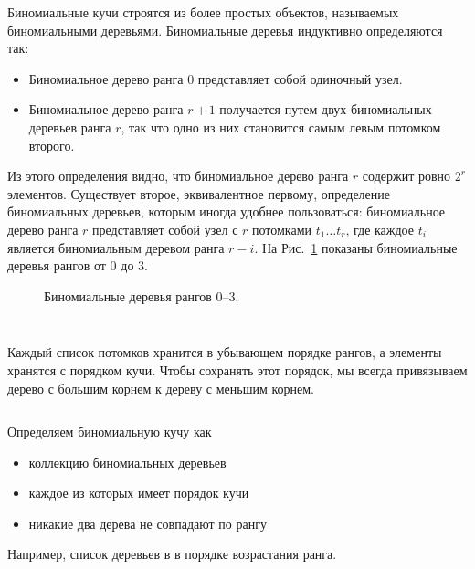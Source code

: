 \begin{frame}[fragile]{}
Биномиальные кучи строятся из более простых объектов, называемых
биномиальными деревьями. Биномиальные деревья индуктивно определяются
так:
\begin{itemize}
  \item Биномиальное дерево ранга 0 представляет собой одиночный узел.
  \item Биномиальное дерево ранга $r+1$ получается путем
   двух биномиальных деревьев ранга $r$, так
  что одно из них становится самым левым потомком второго.
\end{itemize}
Из этого определения видно, что биномиальное дерево ранга $r$ содержит
ровно $2^r$ элементов.  Существует второе, эквивалентное первому,
определение биномиальных деревьев, которым иногда удобнее
пользоваться: биномиальное дерево ранга $r$ представляет собой узел
с $r$ потомками $t_1\ldots t_r$, где каждое $t_i$ является
биномиальным деревом ранга $r-i$.  На Рис.~\ref{fig:3.3} показаны
биномиальные деревья рангов от 0 до 3.
\end{frame}


\begin{frame}[fragile]{}
\begin{figure}[h]
  \centering
  
  \caption{Биномиальные деревья рангов 0--3.}
  \label{fig:3.3}
\end{figure}

\inputminted[firstline=5, lastline=6] {haskell}{code/BinomialHeap.lhs}

\end{frame}


\begin{frame}[fragile]{}
\inputminted[firstline=5, lastline=6] {haskell}{code/BinomialHeap.lhs}
Каждый список потомков хранится в убывающем порядке рангов, а элементы
хранятся с порядком кучи.  Чтобы сохранять этот порядок, мы всегда
привязываем дерево с большим корнем к дереву с меньшим корнем.
\inputminted[firstline=11, lastline=14] {haskell}{code/BinomialHeap.lhs}
\end{frame}


\begin{frame}[fragile]{}
Определяем биномиальную кучу как 
\begin{itemize}
  \item коллекцию биномиальных деревьев
  \item каждое из которых имеет порядок кучи
  \item никакие два дерева не совпадают по рангу
\end{itemize} 
Например, список деревьев в в порядке возрастания ранга.
\inputminted[firstline=6, lastline=6] {haskell}{code/BinomialHeap.lhs}
\end{frame}


